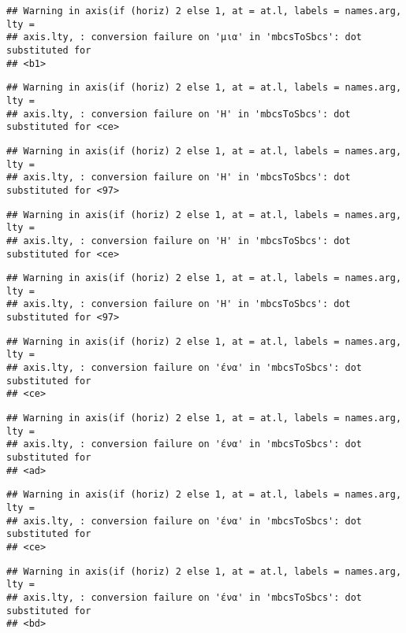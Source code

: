 \documentclass[
]{article}
\begin{document}
\begin{verbatim}
## Warning in axis(if (horiz) 2 else 1, at = at.l, labels = names.arg, lty =
## axis.lty, : conversion failure on 'μια' in 'mbcsToSbcs': dot substituted for
## <b1>
\end{verbatim}

\begin{verbatim}
## Warning in axis(if (horiz) 2 else 1, at = at.l, labels = names.arg, lty =
## axis.lty, : conversion failure on 'Η' in 'mbcsToSbcs': dot substituted for <ce>
\end{verbatim}

\begin{verbatim}
## Warning in axis(if (horiz) 2 else 1, at = at.l, labels = names.arg, lty =
## axis.lty, : conversion failure on 'Η' in 'mbcsToSbcs': dot substituted for <97>
\end{verbatim}

\begin{verbatim}
## Warning in axis(if (horiz) 2 else 1, at = at.l, labels = names.arg, lty =
## axis.lty, : conversion failure on 'Η' in 'mbcsToSbcs': dot substituted for <ce>
\end{verbatim}

\begin{verbatim}
## Warning in axis(if (horiz) 2 else 1, at = at.l, labels = names.arg, lty =
## axis.lty, : conversion failure on 'Η' in 'mbcsToSbcs': dot substituted for <97>
\end{verbatim}

\begin{verbatim}
## Warning in axis(if (horiz) 2 else 1, at = at.l, labels = names.arg, lty =
## axis.lty, : conversion failure on 'ένα' in 'mbcsToSbcs': dot substituted for
## <ce>
\end{verbatim}

\begin{verbatim}
## Warning in axis(if (horiz) 2 else 1, at = at.l, labels = names.arg, lty =
## axis.lty, : conversion failure on 'ένα' in 'mbcsToSbcs': dot substituted for
## <ad>
\end{verbatim}

\begin{verbatim}
## Warning in axis(if (horiz) 2 else 1, at = at.l, labels = names.arg, lty =
## axis.lty, : conversion failure on 'ένα' in 'mbcsToSbcs': dot substituted for
## <ce>
\end{verbatim}

\begin{verbatim}
## Warning in axis(if (horiz) 2 else 1, at = at.l, labels = names.arg, lty =
## axis.lty, : conversion failure on 'ένα' in 'mbcsToSbcs': dot substituted for
## <bd>
\end{verbatim}
\end{document}
